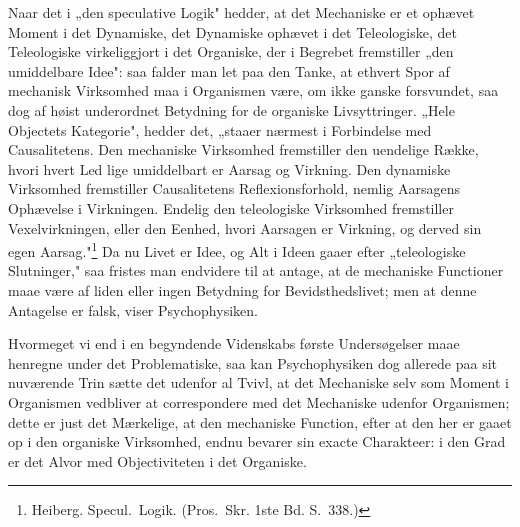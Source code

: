 \documentclass[12pt]{book}
\newcommand{\opage}[1]{\marginnote{\footnotesize\textit{[#1]}}}
\begin{document}
Naar det i „den speculative Logik" hedder, at det Mechaniske er et ophævet Moment i det Dynamiske,
det Dynamiske ophævet i det Teleologiske, det Teleologiske virkeliggjort i det Organiske, der i
Begrebet fremstiller „den umiddelbare Idee": saa falder man let paa den Tanke, at ethvert Spor af
mechanisk Virksomhed maa i Organismen være, om ikke ganske forsvundet, saa dog af høist underordnet
Betydning for de organiske Livsyttringer. „Hele Objectets Kategorie", hedder det, „staaer nærmest i
Forbindelse med Causalitetens. Den mechaniske Virksomhed fremstiller den uendelige Række, hvori hvert
Led lige umiddelbart er Aarsag og Virkning. Den dynamiske Virksomhed fremstiller Causalitetens
Reflexionsforhold, nemlig Aarsagens Ophævelse i Virkningen. Endelig den teleologiske Virksomhed
fremstiller Vexelvirkningen, eller den Eenhed, hvori Aarsagen er Virkning, og derved sin egen
Aarsag."\footnote{Heiberg. Specul.\ Logik. (Pros.\ Skr. 1ste Bd. S.~338.)} Da nu Livet er Idee, og
Alt i Ideen gaaer efter „teleologiske Slutninger," saa fristes man endvidere til at antage, at de
mechaniske Functioner maae være af liden eller ingen Betydning for Bevidsthedslivet; men at denne
Antagelse er falsk, viser Psychophysiken.

Hvormeget vi end i en begyndende Videnskabs første
\opage{415} Undersøgelser maae henregne under det Problematiske, saa kan Psychophysiken dog allerede paa sit
nuværende Trin sætte det udenfor al Tvivl, at det Mechaniske selv som Moment i Organismen vedbliver at
correspondere med det Mechaniske udenfor Organismen; dette er just det Mærkelige, at den mechaniske
Function, efter at den her er gaaet op i den organiske Virksomhed, endnu bevarer sin exacte
Charakteer: i den Grad er det Alvor med Objectiviteten i det Organiske.
\end{document}
